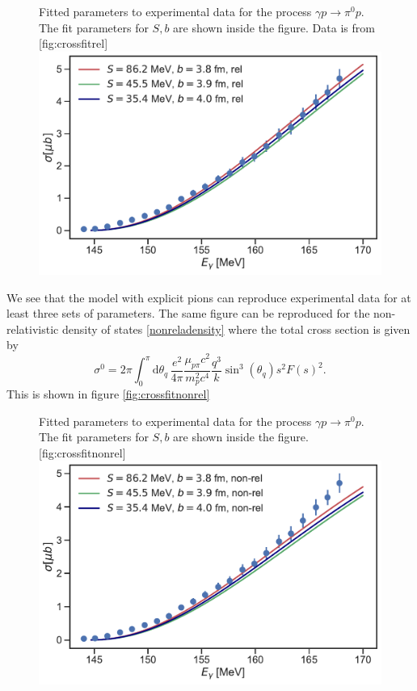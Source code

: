 \begin{figure}[H]
	\begin{sidecaption}{Fitted parameters to experimental data for the process $\gamma p \rightarrow \pi^0 p$. The fit parameters for $S,b$ are shown inside the figure. Data is from \cite{Schmidt_2001}}[fig:crossfitrel]
		\includegraphics[width=\linewidth]{Figures/crossfit_rel.pdf}
	\end{sidecaption}
\end{figure}
We see that the model with explicit pions can reproduce experimental data for at least three sets of parameters. The same figure can be reproduced for the non-relativistic density of states \eqref{nonreladensity} where the total cross section is given by
\begin{equation} \label{nonrelcrossfit}
	\sigma^0 = 2\pi \int_0^\pi \text{d}\theta_q \, \frac{e^2}{4\pi}\frac{\mu_{p\pi}c^2}{m_p^2 c^4}\frac{q^3}{k}\sin^3(\theta_q)s^2 F(s)^2.
\end{equation} 
This is shown in figure \ref{fig:crossfitnonrel}
\begin{figure}[H]
	\begin{sidecaption}{Fitted parameters to experimental data for the process $\gamma p \rightarrow \pi^0 p$. The fit parameters for $S,b$ are shown inside the figure.}[fig:crossfitnonrel]
		\includegraphics[width=\linewidth]{Figures/crossfit_nonrel.pdf} 
	\end{sidecaption}
\end{figure}
